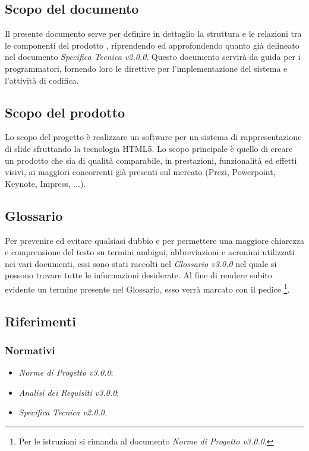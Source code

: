 \subsection{Scopo del documento}
  Il presente documento serve per definire in dettaglio la struttura e le relazioni tra le componenti del prodotto \PROGETTO{}, riprendendo ed approfondendo 
  quanto già delineato nel documento \textit{Specifica Tecnica v2.0.0}. Questo documento servirà da guida per i programmatori, fornendo loro le direttive 
  per l'implementazione del sistema e l'attività di codifica.
\subsection{Scopo del prodotto}
  Lo scopo del progetto è realizzare un software per un sistema di rappresentazione di \gls{slide} sfruttando la tecnologia \gls{HTML5}. 
  Lo scopo principale è quello di creare un prodotto che sia di qualità comparabile, in prestazioni, funzionalità ed effetti visivi, 
  ai maggiori concorrenti già presenti sul mercato (Prezi, Powerpoint, Keynote, Impress, ...).
\subsection{Glossario}
Per prevenire ed evitare qualsiasi dubbio e per permettere una maggiore chiarezza e comprensione del testo su termini ambigui, abbreviazioni e acronimi 
utilizzati nei vari documenti, essi sono stati raccolti nel \textit{Glossario v3.0.0} nel quale si possono trovare tutte le informazioni desiderate.
Al fine di rendere subito evidente un termine presente nel Glossario, esso verrà marcato con il pedice \G\footnote{Per le istruzioni si rimanda al documento \textit{Norme di Progetto v3.0.0}.}.
\subsection{Riferimenti}
  \subsubsection{Normativi}
      \begin{itemize}
       \item \textit{Norme di Progetto v3.0.0};
       \item \textit{Analisi dei Requisiti v3.0.0};
       \item \textit{Specifica Tecnica v2.0.0}.
      \end{itemize}
